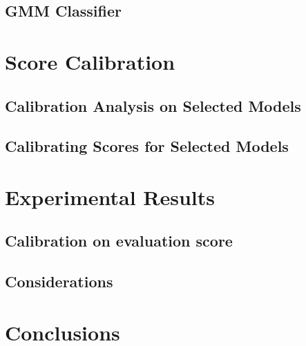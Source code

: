 \documentclass{article}
\begin{document}
\subsection{GMM Classifier}
\section{Score Calibration}
\subsection{Calibration Analysis on Selected Models}
\subsection{Calibrating Scores for Selected Models}
\section{Experimental Results}
\subsection{Calibration on evaluation score}
\subsection{Considerations}
\section{Conclusions}


\newpage



\end{document}
